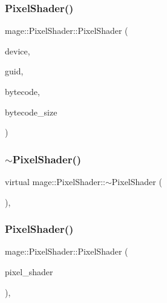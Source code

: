 \hypertarget{classmage_1_1_pixel_shader_a1683469d2d043f939866fb89fa775548}{}\label{classmage_1_1_pixel_shader_a1683469d2d043f939866fb89fa775548} 
\subsubsection{\texorpdfstring{Pixel\+Shader()}{PixelShader()}\hspace{0.1cm}{\footnotesize\ttfamily [2/3]}}
{\footnotesize\ttfamily mage\+::\+Pixel\+Shader\+::\+Pixel\+Shader (\begin{DoxyParamCaption}\item[{\hyperlink{namespacemage_ae74f374780900893caa5555d1031fd79}{Com\+Ptr}$<$ I\+D3\+D11\+Device2 $>$}]{device,  }\item[{const wstring \&}]{guid,  }\item[{const void $\ast$}]{bytecode,  }\item[{S\+I\+Z\+E\+\_\+T}]{bytecode\+\_\+size }\end{DoxyParamCaption})}

\hypertarget{classmage_1_1_pixel_shader_ac339b9196db24d18143ad36013d598b2}{}\label{classmage_1_1_pixel_shader_ac339b9196db24d18143ad36013d598b2} 
\subsubsection{\texorpdfstring{$\sim$\+Pixel\+Shader()}{~PixelShader()}}
{\footnotesize\ttfamily virtual mage\+::\+Pixel\+Shader\+::$\sim$\+Pixel\+Shader (\begin{DoxyParamCaption}{ }\end{DoxyParamCaption})\hspace{0.3cm}{\ttfamily [virtual]}, {\ttfamily [default]}}

\hypertarget{classmage_1_1_pixel_shader_a361df943e40e9015ac4b769af130ce79}{}\label{classmage_1_1_pixel_shader_a361df943e40e9015ac4b769af130ce79} 
\subsubsection{\texorpdfstring{Pixel\+Shader()}{PixelShader()}\hspace{0.1cm}{\footnotesize\ttfamily [3/3]}}
{\footnotesize\ttfamily mage\+::\+Pixel\+Shader\+::\+Pixel\+Shader (\begin{DoxyParamCaption}\item[{const \hyperlink{classmage_1_1_pixel_shader}{Pixel\+Shader} \&}]{pixel\+\_\+shader }\end{DoxyParamCaption})\hspace{0.3cm}{\ttfamily [private]}, {\ttfamily [delete]}}



